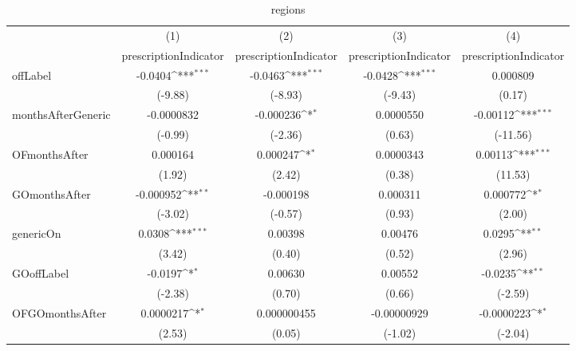 \begin{table}[htbp]\centering
\def\sym#1{\ifmmode^{#1}\else\(^{#1}\)\fi}
\caption{regions\label{tab1}}
\begin{tabular}{l*{4}{c}}
\hline\hline
            &\multicolumn{1}{c}{(1)}&\multicolumn{1}{c}{(2)}&\multicolumn{1}{c}{(3)}&\multicolumn{1}{c}{(4)}\\
            &\multicolumn{1}{c}{prescriptionIndicator}&\multicolumn{1}{c}{prescriptionIndicator}&\multicolumn{1}{c}{prescriptionIndicator}&\multicolumn{1}{c}{prescriptionIndicator}\\
\hline
offLabel    &     -0.0404\sym{***}&     -0.0463\sym{***}&     -0.0428\sym{***}&    0.000809         \\
            &     (-9.88)         &     (-8.93)         &     (-9.43)         &      (0.17)         \\
[1em]
monthsAfterGeneric&  -0.0000832         &   -0.000236\sym{*}  &   0.0000550         &    -0.00112\sym{***}\\
            &     (-0.99)         &     (-2.36)         &      (0.63)         &    (-11.56)         \\
[1em]
OFmonthsAfter&    0.000164         &    0.000247\sym{*}  &   0.0000343         &     0.00113\sym{***}\\
            &      (1.92)         &      (2.42)         &      (0.38)         &     (11.53)         \\
[1em]
GOmonthsAfter&   -0.000952\sym{**} &   -0.000198         &    0.000311         &    0.000772\sym{*}  \\
            &     (-3.02)         &     (-0.57)         &      (0.93)         &      (2.00)         \\
[1em]
genericOn   &      0.0308\sym{***}&     0.00398         &     0.00476         &      0.0295\sym{**} \\
            &      (3.42)         &      (0.40)         &      (0.52)         &      (2.96)         \\
[1em]
GOoffLabel  &     -0.0197\sym{*}  &     0.00630         &     0.00552         &     -0.0235\sym{**} \\
            &     (-2.38)         &      (0.70)         &      (0.66)         &     (-2.59)         \\
[1em]
OFGOmonthsAfter&   0.0000217\sym{*}  & 0.000000455         & -0.00000929         &  -0.0000223\sym{*}  \\
            &      (2.53)         &      (0.05)         &     (-1.02)         &     (-2.04)         \\

\end{tabular}
\end{table}
